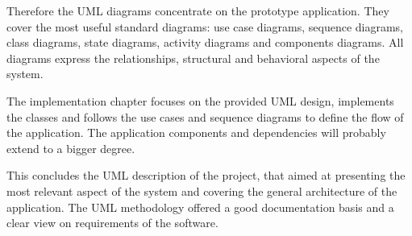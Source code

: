 Therefore the UML diagrams concentrate on the prototype application. They cover the most useful standard diagrams: use case diagrams, sequence diagrams, class diagrams, state diagrams, activity diagrams and components diagrams. All diagrams express the relationships, structural and behavioral aspects of the system.

The implementation chapter focuses on the provided UML design, implements the classes and follows the use cases and sequence diagrams to define the flow of the application. The application components and dependencies will probably extend to a bigger degree. 

This concludes the UML description of the project, that aimed at presenting the most relevant aspect of the system and covering the general architecture of the application. The UML methodology offered a good documentation basis and a clear view on requirements of the software.

\clearpage
